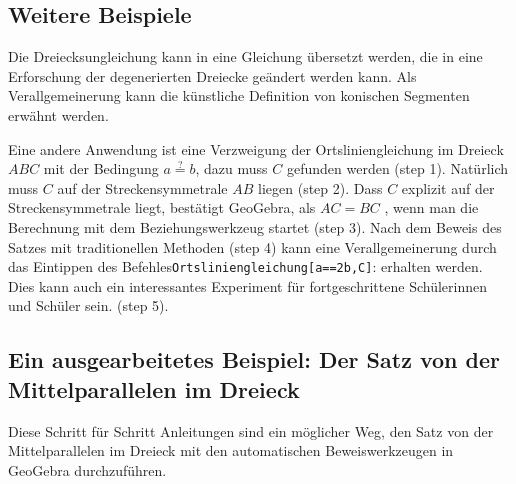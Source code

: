 \documentclass{article}
\begin{document}
\subsection{Weitere Beispiele}

Die Dreiecksungleichung kann in eine Gleichung übersetzt werden, die in eine Erforschung der degenerierten Dreiecke geändert werden kann. Als Verallgemeinerung kann die künstliche Definition von konischen Segmenten erwähnt werden.

Eine andere Anwendung ist eine Verzweigung der Ortsliniengleichung im Dreieck $ABC$ mit der Bedingung $a\stackrel{?}{=}b$, dazu muss $C$ gefunden werden (step 1). Natürlich muss $C$ auf der Streckensymmetrale  $AB$ liegen (step 2). Dass  $C$ explizit auf der Streckensymmetrale liegt, bestätigt GeoGebra, als $AC=BC$ , wenn man die Berechnung mit dem Beziehungswerkzeug startet (step 3). Nach dem Beweis des Satzes mit traditionellen Methoden (step 4) kann eine Verallgemeinerung durch das Eintippen des Befehles\texttt{Ortsliniengleichung[a==2b,C]}: erhalten werden. Dies kann auch ein interessantes Experiment für fortgeschrittene Schülerinnen und Schüler sein. (step 5).

\subsection{Ein ausgearbeitetes Beispiel: Der Satz von der Mittelparallelen im Dreieck}

Diese Schritt für Schritt Anleitungen sind ein möglicher Weg, den Satz von der Mittelparallelen im Dreieck mit den automatischen Beweiswerkzeugen in GeoGebra durchzuführen.
\end{document}
